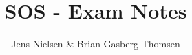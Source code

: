 


\title{\vspace{-2cm} SOS - Exam Notes}
\author{Jens Nielsen \& Brian Gasberg Thomsen}


\maketitle
\tableofcontents

\clearpage

\clearpage

\clearpage

\clearpage

\clearpage

\clearpage

\clearpage




